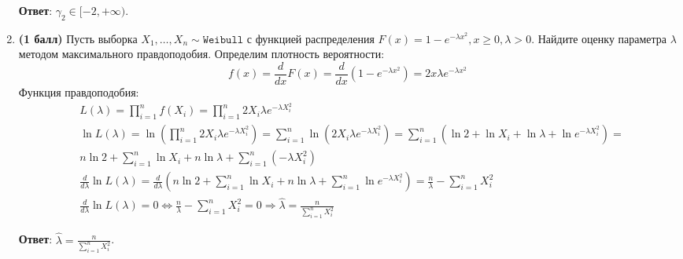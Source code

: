 \documentclass{assignment}
\begin{document}
\begin{enumerate}
    \textbf{Ответ}: $\gamma_2 \in [-2, +\infty)$.
    \finish

    \item \textbf{(1 балл)} Пусть выборка $X_1, \ldots, X_n \sim \texttt{Weibull}$ с функцией распределения $F(x) = 1 - e^{-\lambda x^2}, x \geq 0, \lambda > 0$. Найдите оценку параметра $\lambda$ методом максимального правдоподобия.
    \start
    Определим плотность вероятности:
    \begin{equation}
        f(x) = \frac{d}{dx}F(x) = \frac{d}{dx}(1 - e^{-\lambda x^2}) = 2 x \lambda e^{-\lambda x^2}
    \end{equation}
    Функция правдоподобия:
    \begin{align*}
        &L(\lambda) = \prod_{i=1}^{n}f(X_i) = \prod_{i=1}^{n}2 X_i \lambda e^{-\lambda X_i^2} \\
        &\ln L(\lambda) = \ln (\prod_{i=1}^{n}2 X_i \lambda e^{-\lambda X_i^2}) = \sum_{i=1}^{n} \ln (2 X_i \lambda e^{-\lambda X_i^2}) = \sum_{i=1}^{n} (\ln 2 + \ln X_i  + \ln \lambda + \ln e^{-\lambda X_i^2}) = \\
        &n\ln 2 + \sum_{i=1}^{n}\ln X_i  + n\ln \lambda + \sum_{i=1}^{n}(-\lambda X_i^2) \\
        &\frac{d}{d\lambda}\ln L(\lambda) = \frac{d}{d\lambda} (n\ln 2 + \sum_{i=1}^{n}\ln X_i  + n\ln \lambda + \sum_{i=1}^{n}\ln e^{-\lambda X_i^2}) = \frac{n}{\lambda} - \sum_{i=1}^{n} X_i^2 \\
        &\frac{d}{d\lambda}\ln L(\lambda) = 0 \Leftrightarrow \frac{n}{\lambda} - \sum_{i=1}^{n} X_i^2 = 0 \Rightarrow \hat{\lambda} = \frac{n}{\sum_{i=1}^{n} X_i^2}
    \end{align*}
    
    \textbf{Ответ}: $\hat{\lambda} = \frac{n}{\sum_{i=1}^{n} X_i^2}$.
    \finish


\end{enumerate}
\end{document}
